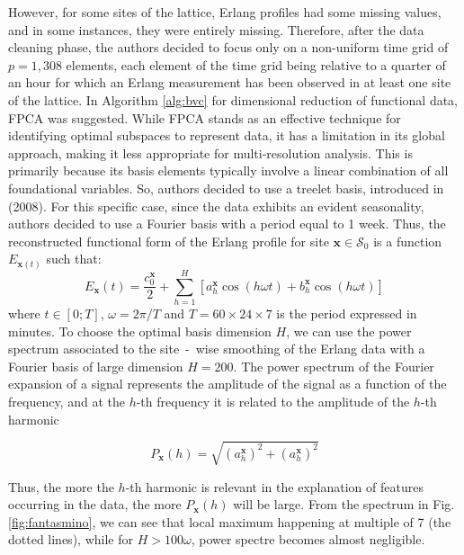 However, for some sites of the lattice, Erlang profiles had some missing values, and in some instances, they were entirely missing. Therefore, after the data cleaning phase, the authors decided to focus only on a non-uniform time grid of $p = 1,308$ elements, each element of the time grid being relative to a quarter of an hour for which an Erlang measurement has been observed in at least one site of the lattice. In Algorithm \ref{alg:bvc} for dimensional reduction of functional data, FPCA was suggested. While FPCA stands as an effective technique for identifying optimal subspaces to represent data, it has a limitation in its global approach, making it less appropriate for multi-resolution analysis. This is primarily because its basis elements typically involve a linear combination of all foundational variables. So, authors decided to use a treelet basis, introduced in \citeauthor{lee_treelets--adaptive_2008} (2008). For this specific case, since the data exhibits an evident seasonality, authors decided to use a Fourier basis with a period equal to 1 week. Thus, the reconstructed functional form of the Erlang profile for site $\textbf{x} \in \mathcal{S}_0$ is a function $E_{\textbf{x}(t)}$ such that:
\begin{equation}
    E_{\textbf{x}}(t)=\frac{c_0^{\textbf{x}}}{2} + \sum_{h=1}^H \left[a_h^{\textbf{x}}\cos \left( h\omega t\right) + b_h^{\textbf{x}}\cos \left( h\omega t\right) \right]
\end{equation}
where $t \in \left[ 0; T\right]$, $\omega = 2\pi/T$ and $T=60 \times 24 \times 7$ is the period expressed in minutes. To choose the optimal basis dimension $H$, we can use the power spectrum associated to the site~-~wise smoothing of the Erlang data with a Fourier basis of large dimension $H = 200$. The power spectrum of the Fourier expansion of a signal represents the amplitude of the signal as a function of the frequency, and at the $h$-th frequency it is related to the amplitude of the $h$-th harmonic

\begin{equation}
    \label{eq:spectrum}
    P_{\mathbf{x}}(h)=\sqrt{(a^{\mathbf{x}}_h)^2 + (a^{\mathbf{x}}_h)^2}
\end{equation}

Thus, the more the $h$-th harmonic is relevant in the explanation of features occurring in the data, the more $P_{\mathbf{x}}(h)$ will be large. From the spectrum in Fig. \ref{fig:fantasmino}, we can see that local maximum happening at multiple of 7 (the dotted lines), while for $H >100\omega$, power spectre becomes almost negligible.

